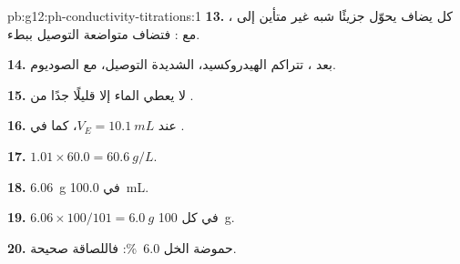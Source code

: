 \begin{solution}{pb:g12:ph-conductivity-titrations:1}
\textbf{13.} كل   يضاف يحوّل جزيئًا شبه غير متأين إلى
، مع  : فتضاف  متواضعة التوصيل
ببطء.

\textbf{14.} بعد ، تتراكم  الهيدروكسيد، الشديدة التوصيل،
مع  الصوديوم.

\textbf{15.}  لا يعطي الماء إلا قليلًا جدًا من .

\textbf{16.} عند $V_E = \qty{10.1}{mL}$، كما في .

\textbf{17.} $1.01 \times 60.0 = \qty{60.6}{g/L}$.

\textbf{18.} \qty{6.06}{g} في \qty{100.0}{mL}.

\textbf{19.} $6.06 \times 100 / 101 = \qty{6.0}{g}$ في كل \qty{100}{g}.

\textbf{20.} حموضة الخل \qty{6.0}{\percent}: فاللصاقة
صحيحة.
\end{solution}
